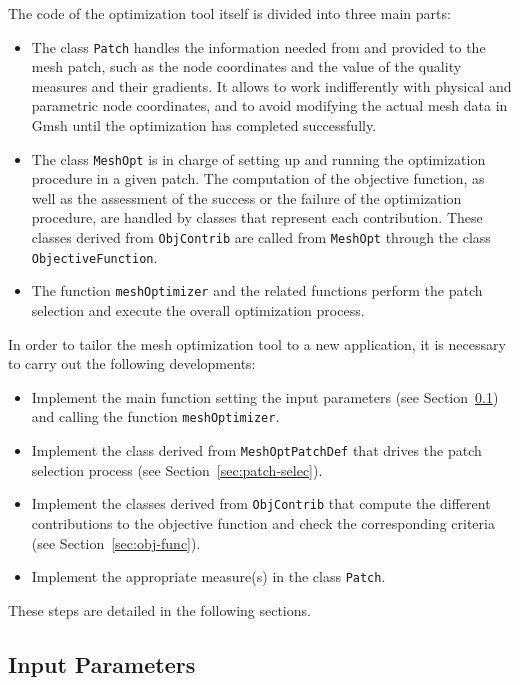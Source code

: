 \documentclass[12pt,a4paper,a4wide]{article}
\begin{document}
The code of the optimization tool itself is divided into three main
parts:

\begin{itemize}
\item The class \texttt{Patch} handles the information needed from
and provided to the mesh patch, such as the node coordinates and the
value of the quality measures and their gradients. It allows to work
indifferently with physical and parametric node coordinates, and to
avoid modifying the actual mesh data in Gmsh until the optimization
has completed successfully.
\item The class \texttt{MeshOpt} is in charge of setting up and
running the optimization procedure in a given patch. The computation
of the objective function, as well as the assessment of the success
or the failure of the optimization procedure, are handled by classes
that represent each contribution. These classes derived from
\texttt{ObjContrib} are called from \texttt{MeshOpt} through the
class \texttt{ObjectiveFunction}.
\item The function \texttt{meshOptimizer} and the related functions
perform the patch selection and execute the overall optimization
process.
\end{itemize}

In order to tailor the mesh optimization tool to a new application, it
is necessary to carry out the following developments:
\begin{itemize}
\item Implement the main function setting the input parameters (see
Section~\ref{sec:input-param}) and calling the function
\texttt{meshOptimizer}.
\item Implement the class derived from \texttt{MeshOptPatchDef}
that drives the patch selection process (see
Section~\ref{sec:patch-selec}).
\item Implement the classes derived from \texttt{ObjContrib} that
compute the different contributions to the objective function and
check the corresponding criteria (see Section~\ref{sec:obj-func}).
\item Implement the appropriate measure(s) in the class
\texttt{Patch}.
\end{itemize}

These steps are detailed in the following sections.

\subsection{Input Parameters}\label{sec:input-param}
\end{document}
